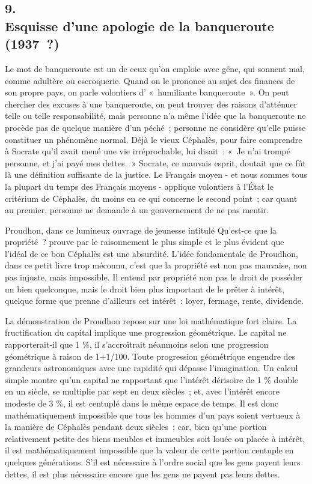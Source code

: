 \documentclass[french,twoside]{book} %
\begin{document}
\subsection[9. Esquisse d'une apologie de la banqueroute  (1937 ?)]{9. \\
Esquisse d'une apologie de la banqueroute \protect\footnotemark  \\
(1937 ?)}
\noindent \par
Le mot de banqueroute est un de ceux qu'on emploie avec gêne, qui sonnent mal, comme adultère ou escroquerie. Quand on le prononce au sujet des finances de son propre pays, on parle volontiers d' « humiliante banque­route ». On peut chercher des excuses à une banqueroute, on peut trouver des raisons d'atténuer telle ou telle responsabilité, mais personne n'a même l'idée que la banqueroute ne procède pas de quelque manière d'un péché ; personne ne considère qu'elle puisse constituer un phénomène normal. Déjà le vieux Céphalès, pour faire comprendre à Socrate qu'il avait mené une vie irrépro­chable, lui disait : « Je n'ai trompé personne, et j'ai payé mes dettes. » Socrate, ce mauvais esprit, doutait que ce fût là une définition suffisante de la justice. Le Français moyen - et nous sommes tous la plupart du temps des Français moyens - applique volontiers à l'État le critérium de Céphalès, du moins en ce qui concerne le second point ; car quant au premier, personne ne demande à un gouvernement de ne pas mentir.\par
Proudhon, dans ce lumineux ouvrage de jeunesse intitulé Qu'est-ce que la propriété ? prouve par le raisonnement le plus simple et le plus évident que l'idéal de ce bon Céphalès est une absurdité. L'idée fondamentale de Proud­hon, dans ce petit livre trop méconnu, c'est que la propriété est non pas mauvaise, non pas injuste, mais impossible. Il entend par propriété non pas le droit de posséder un bien quelconque, mais le droit bien plus important de le prêter à intérêt, quelque forme que prenne d'ailleurs cet intérêt : loyer, fermage, rente, dividende.\par
La démonstration de Proudhon repose sur une loi mathématique fort claire. La fructification du capital implique une progression géométrique. Le capital ne rapporterait-il que 1 \%, il s'accroîtrait néanmoins selon une pro­gression géométrique à raison de 1+1/100. Toute progression géométrique engendre des grandeurs astronomiques avec une rapidité qui dépasse l'imagi­nation. Un calcul simple montre qu'un capital ne rapportant que l'intérêt dérisoire de 1 \% double en un siècle, se multiplie par sept en deux siècles ; et, avec l'intérêt encore modeste de 3 \%, il est centuplé dans le même espace de temps. Il est donc mathématiquement impossible que tous les hommes d'un pays soient vertueux à la manière de Céphalès pendant deux siècles ; car, bien qu'une portion relativement petite des biens meubles et immeubles soit louée ou placée à intérêt, il est mathématiquement impossible que la valeur de cette portion centuple en quelques générations. S'il est nécessaire à l'ordre social que les gens payent leurs dettes, il est plus nécessaire encore que les gens ne payent pas leurs dettes.\par
\end{document}
